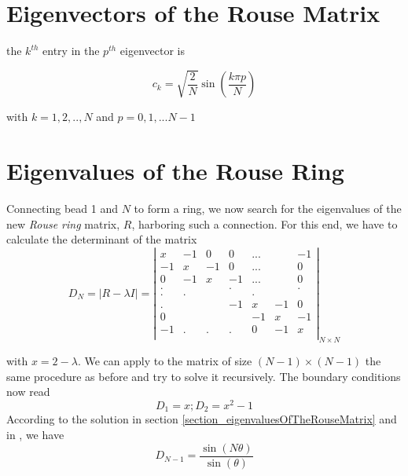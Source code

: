 \documentclass[12pt]{report}
\begin{document}
\section{Eigenvectors of the Rouse Matrix}\label{section_eigenvectorsOfTheRouseMatrix}
the $k^{th}$ entry in the $p^{th}$ eigenvector is 

\begin{equation*}
c_k = \sqrt{\frac{2}{N}}\sin(\frac{k\pi p}{N})
\end{equation*}

with $k=1,2,..,N$ and $p=0,1,...N-1$

\section{Eigenvalues of the Rouse Ring}\label{section_eigenvaluesRouseRing}
Connecting bead 1 and $N$ to form a ring, we now search for the eigenvalues of the new \textit{Rouse ring} matrix, $R$, harboring such a connection. For this end, we have to calculate the determinant of the matrix
\begin{equation*}
D_N=|R-\lambda I|=\left|
\begin{matrix}
 x  & -1 &  0 &  0 &...&   & -1 \\
-1  &  x & -1 &  0 &...&   &  0 \\
 0  & -1 &  x & -1 &...&   &  0 \\
 .  &    &    &  . &   &   &  . \\
  . &   .&    &    &  .&   & \\
 .  &    &    & -1 & x &-1 & 0 \\
 0  &    &    &    & -1& x & -1 \\
 -1 &   .&  . & .  &  0&-1 &  x \\     
\end{matrix}
\right|_{N\times N}
\end{equation*}

with $x=2-\lambda$. We can apply to the matrix of size $(N-1)\times (N-1)$ the same procedure as before and try to solve it recursively. The boundary conditions now read
\begin{equation*}
D_1 = x; D_2 = x^2-1
\end{equation*}
According to the solution in section \ref{section_eigenvaluesOfTheRouseMatrix} and in \cite{lin2011polymer}, we have 
\begin{equation*}
D_{N-1}= \frac{\sin(N\theta)}{\sin(\theta)}
\end{equation*}
\end{document}
